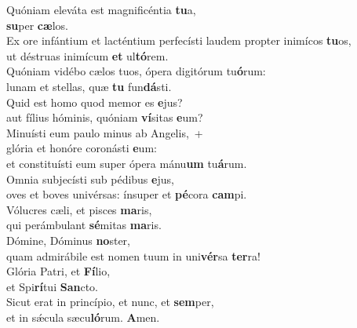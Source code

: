 \evenverse Quóniam eleváta est magnificéntia \textbf{tu}a,~\*\\
\evenverse \textbf{su}per \textbf{cæ}los.\\
\oddverse Ex ore infántium et lacténtium perfecísti laudem propter inimícos \textbf{tu}os,~\*\\
\oddverse ut déstruas inimícum \textbf{et} ul\textbf{tó}rem.\\
\evenverse Quóniam vidébo cælos tuos, ópera digitórum tu\textbf{ó}rum:~\*\\
\evenverse lunam et stellas, quæ \textbf{tu} fun\textbf{dá}sti.\\
\oddverse Quid est homo quod memor es \textbf{e}jus?~\*\\
\oddverse aut fílius hóminis, quóniam \textbf{ví}sitas \textbf{e}um?\\
\evenverse Minuísti eum paulo minus ab Angelis,~+\\
\evenverse  glória et honóre coronásti \textbf{e}um:~\*\\
\evenverse et constituísti eum super ópera mánu\textbf{um} tu\textbf{á}rum.\\
\oddverse Omnia subjecísti sub pédibus \textbf{e}jus,~\*\\
\oddverse oves et boves univérsas: ínsuper et \textbf{pé}cora \textbf{cam}pi.\\
\evenverse Vólucres cæli, et pisces \textbf{ma}ris,~\*\\
\evenverse qui perámbulant \textbf{sé}mitas \textbf{ma}ris.\\
\oddverse Dómine, Dóminus \textbf{no}ster,~\*\\
\oddverse quam admirábile est nomen tuum in uni\textbf{vér}sa \textbf{ter}ra!\\
\evenverse Glória Patri, et \textbf{Fí}lio,~\*\\
\evenverse et Spi\textbf{rí}tui \textbf{San}cto.\\
\oddverse Sicut erat in princípio, et nunc, et \textbf{sem}per,~\*\\
\oddverse et in sǽcula sæcu\textbf{ló}rum. \textbf{A}men.\\
